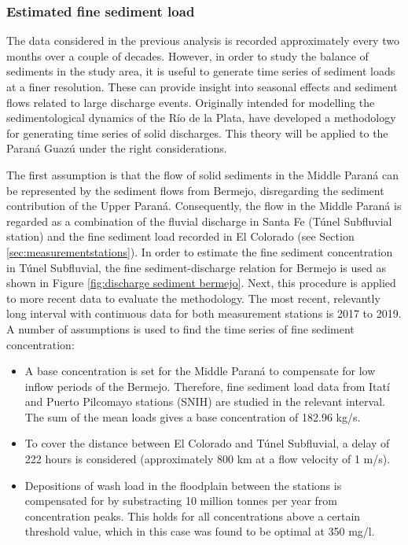 \subsubsection{Estimated fine sediment load}
The data considered in the previous analysis is recorded approximately every two months over a couple of decades. However, in order to study the balance of sediments in the study area, it is useful to generate time series of sediment loads at a finer resolution. These can provide insight into seasonal effects and sediment flows related to large discharge events. Originally intended for modelling the sedimentological dynamics of the Río de la Plata, \citeauthor{reMetodologiaParaGeneracion2009} have developed a methodology for generating time series of solid discharges. This theory will be applied to the Paraná Guazú under the right considerations.


The first assumption is that the flow of solid sediments in the Middle Paraná can be represented by the sediment flows from Bermejo, disregarding the sediment contribution of the Upper Paraná. Consequently, the flow in the Middle Paraná is regarded as a combination of the fluvial discharge in Santa Fe (Túnel Subfluvial station) and the fine sediment load recorded in El Colorado (see Section \ref{sec:measurementstations}). In order to estimate the fine sediment concentration in Túnel Subfluvial, the fine sediment-discharge relation for Bermejo is used as shown in Figure \ref{fig:discharge sediment bermejo}.
Next, this procedure is applied to more recent data to evaluate the methodology. The most recent, relevantly long interval with continuous data for both measurement stations is 2017 to 2019. A number of assumptions is used to find the time series of fine sediment concentration:

\begin{itemize}
    \item A base concentration is set for the Middle Paraná to compensate for low inflow periods of the Bermejo. Therefore, fine sediment load data from Itatí and Puerto Pilcomayo stations (SNIH) are studied in the relevant interval. The sum of the mean loads gives a base concentration of 182.96 kg/s.
    \item To cover the distance between El Colorado and Túnel Subfluvial, a delay of 222 hours is considered (approximately 800 km at a flow velocity of 1 m/s). 
    \item Depositions of wash load in the floodplain between the stations is compensated for by substracting 10 million tonnes per year from concentration peaks. This holds for all concentrations above a certain threshold value, which in this case was found to be optimal at 350 mg/l.
\end{itemize}

